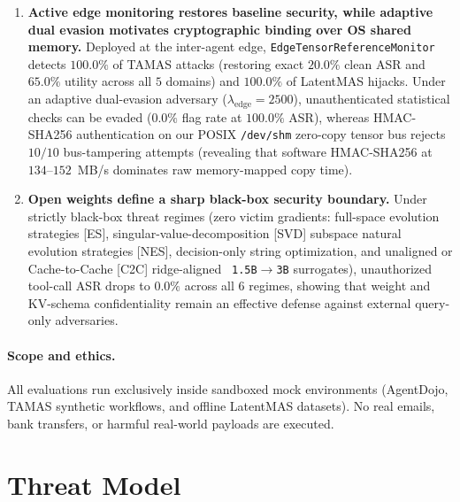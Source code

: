 \documentclass{article}
\begin{document}
\begin{enumerate}
  $81.2\%$ ASR, $50.0\%$ on $3$-worker Star and $3$-hop pure-latent graphs, and
  $50.0\%$ under paraphrased prompts and reordered tool schemas ($n=6$).
  \item \textbf{Active edge monitoring restores baseline security, while adaptive
  dual evasion motivates cryptographic binding over OS shared memory.} Deployed
  at the inter-agent edge, \texttt{EdgeTensorReferenceMonitor} detects
  $100.0\%$ of TAMAS attacks (restoring exact $20.0\%$ clean ASR and $65.0\%$
  utility across all $5$ domains) and $100.0\%$ of LatentMAS hijacks. Under an
  adaptive dual-evasion adversary ($\lambda_{\text{edge}}=2500$), unauthenticated
  statistical checks can be evaded ($0.0\%$ flag rate at $100.0\%$ ASR), whereas
  HMAC-SHA256 authentication on our POSIX \texttt{/dev/shm} zero-copy tensor bus
  rejects $10/10$ bus-tampering attempts (revealing that software HMAC-SHA256 at
  $134$--$152$~MB/s dominates raw memory-mapped copy time).
  \item \textbf{Open weights define a sharp black-box security boundary.} Under
  strictly black-box threat regimes (zero victim gradients: full-space evolution
  strategies [ES], singular-value-decomposition [SVD] subspace natural evolution
  strategies [NES], decision-only string optimization, and unaligned or
  Cache-to-Cache [C2C] ridge-aligned~\citep{c2c} \texttt{1.5B}$\to$\texttt{3B}
  surrogates), unauthorized tool-call ASR drops to $0.0\%$ across all $6$
  regimes, showing that weight and KV-schema confidentiality remain an effective
  defense against external query-only adversaries.
\end{enumerate}

\paragraph{Scope and ethics.}
All evaluations run exclusively inside sandboxed mock environments (AgentDojo,
TAMAS synthetic workflows, and offline LatentMAS datasets). No real emails,
bank transfers, or harmful real-world payloads are executed.

\section{Threat Model}
\label{sec:threat}
\end{document}
